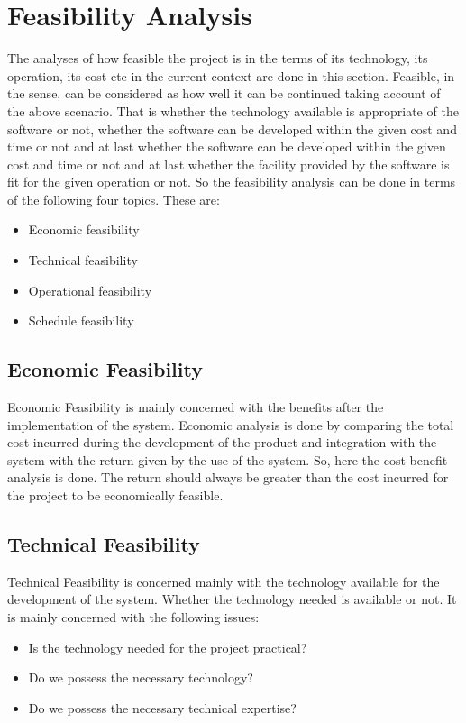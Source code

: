 \section{Feasibility Analysis}\label{sec:fa}
The analyses of how feasible the project is in the terms of its technology, its operation, its cost etc in the current context are 
done in this section. Feasible, in the sense, can be considered as how well it can be continued taking account of the above scenario.
That is whether the technology available is appropriate of the software or not, whether the software can be developed within the given cost
and time or not and at last whether the software can be developed within the given cost and time or not and at last whether the facility provided 
by the software is fit for the given operation or not.
So the feasibility analysis can be done in terms of the following four topics. These are:
\begin{itemize}
    \item Economic feasibility 
	\item Technical feasibility
	\item Operational feasibility
	\item Schedule feasibility
	  
\end{itemize}
\subsection{Economic Feasibility}
 Economic Feasibility is mainly concerned with the benefits after the implementation of the system. Economic analysis is done by comparing the total cost incurred during the development of the product and integration with the system with the return given by the use of the system. So, here the cost benefit analysis is done. The return should always be greater than the cost incurred for the project to be economically feasible.

\subsection{Technical Feasibility}
Technical Feasibility is concerned mainly with the technology available for the development of the system. Whether the technology needed is 
available or not. It is mainly concerned with the following issues:
\begin{itemize}
\item Is the technology needed for the project practical?
\item Do we possess the necessary technology?
\item Do we possess the necessary technical expertise?

\end{itemize}

